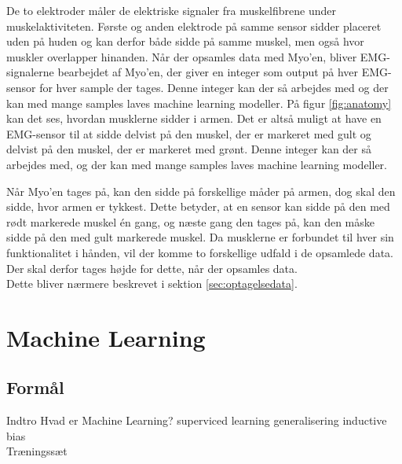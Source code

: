 De to elektroder måler de elektriske signaler fra muskelfibrene under muskelaktiviteten\citep{RefWorks:13}. Første og anden elektrode på samme sensor sidder placeret uden på huden og kan derfor både sidde på samme muskel, men også hvor muskler overlapper hinanden. Når der opsamles data med Myo'en, bliver EMG-signalerne bearbejdet af Myo'en, der giver en integer som output på hver EMG-sensor for hver sample der tages. Denne integer kan der så arbejdes med og der kan med mange samples laves machine learning modeller. På figur \ref{fig:anatomy} kan det ses, hvordan musklerne sidder i armen. Det er altså muligt at have en EMG-sensor til at sidde delvist på den muskel, der er markeret med gult og delvist på den muskel, der er markeret med grønt. Denne integer kan der så arbejdes med, og der kan med mange samples laves machine learning modeller.


Når Myo'en tages på, kan den sidde på forskellige måder på armen, dog skal den sidde, hvor armen er tykkest. Dette betyder, at en sensor kan sidde på den med rødt markerede muskel én gang, og næste gang den tages på, kan den måske sidde på den med gult markerede muskel. Da musklerne er forbundet til hver sin funktionalitet i hånden, vil der komme to forskellige udfald i de opsamlede data. Der skal derfor tages højde for dette, når der opsamles data.\\
Dette bliver nærmere beskrevet i sektion \ref{sec:optagelsedata}.

\section{Machine Learning}
\label{sec:machineLearning}

\subsection{Formål}

Indtro
Hvad er Machine Learning?
superviced learning
generalisering
inductive bias
\\

Træningssæt 

